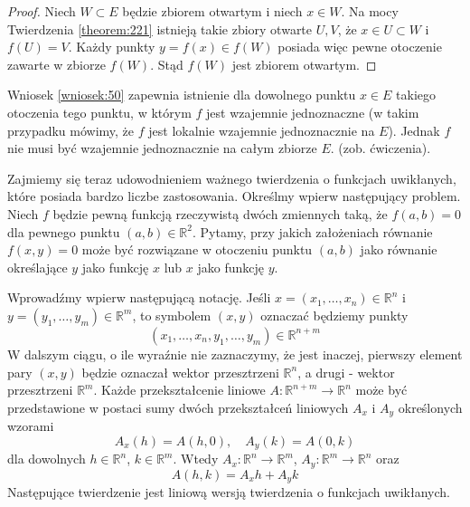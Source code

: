 \documentclass[leqno]{article}
\begin{document}
\begin{justify}
\begin{proof}
    Niech $W \subset E$ będzie zbiorem otwartym i niech $x \in W$. Na mocy Twierdzenia \ref{theorem:221} istnieją takie 
    zbiory otwarte $U, V$, że $x \in U \subset W$ i $f(U) = V$. Każdy punkty $y = f(x) \in f(W)$ posiada więc pewne otoczenie 
    zawarte w zbiorze $f(W)$. Stąd $f(W)$ jest zbiorem otwartym. 
\end{proof}

\begin{uwaga}
    Wniosek \ref{wniosek:50} zapewnia istnienie dla dowolnego punktu $x \in E$ takiego otoczenia
    tego punktu, w którym $f$ jest wzajemnie jednoznaczne (w takim przypadku mówimy, że $f$ jest lokalnie wzajemnie jednoznacznie na $E$).
    Jednak $f$ nie musi być wzajemnie jednoznacznie na całym zbiorze $E$. (zob. ćwiczenia).
\end{uwaga}

Zajmiemy się teraz udowodnieniem ważnego twierdzenia o funkcjach uwikłanych, które posiada bardzo liczbe zastosowania.
Określmy wpierw następujący problem. Niech $f$ będzie pewną funkcją rzeczywistą dwóch zmiennych taką, że $f(a,b) = 0$ dla 
pewnego punktu $(a,b) \in \mathbb{R}^2$. Pytamy, przy jakich założeniach równanie $f(x,y) = 0$ może być rozwiązane w otoczeniu punktu $(a,b)$
jako równanie określające $y$ jako funkcję $x$ lub $x$ jako funkcję $y$.

Wprowadźmy wpierw następującą notację. Jeśli $x = (x_1, \ldots, x_n) \in \mathbb{R}^n$ i $y = (y_1, \ldots, y_m) \in \mathbb{R}^m$, to
symbolem $(x,y)$ oznaczać będziemy punkty 
    \[
        (x_1, \ldots, x_n, y_1, \ldots, y_m) \in \mathbb{R}^{n + m}
    \]
    W dalszym ciągu, o ile wyraźnie nie zaznaczymy, że jest inaczej, pierwszy element pary $(x,y)$ będzie oznaczał 
    wektor przesztrzeni $\mathbb{R}^n$, a drugi - wektor przesztrzeni $\mathbb{R}^m$. Każde przekształcenie liniowe 
    $A : \mathbb{R}^{n+m} \to \mathbb{R}^n$ może być przedstawione w postaci sumy dwóch przekształceń liniowych $A_x$ i $A_y$ określonych wzorami 
    \[
        A_x(h) = A(h, 0), \quad A_y(k) = A(0, k)
    \]
    dla dowolnych $h \in \mathbb{R}^n$, $k \in \mathbb{R}^m$. Wtedy $A_x : \mathbb{R}^n \to \mathbb{R}^m$, $A_y : \mathbb{R}^m \to \mathbb{R}^n$ oraz 
    \setcounter{equation}{145}
    \begin{equation}\label{eq:146}
        A(h,k) = A_x h + A_y k
    \end{equation}
    Następujące twierdzenie jest liniową wersją twierdzenia o funkcjach uwikłanych.


\end{justify}
\end{document}
